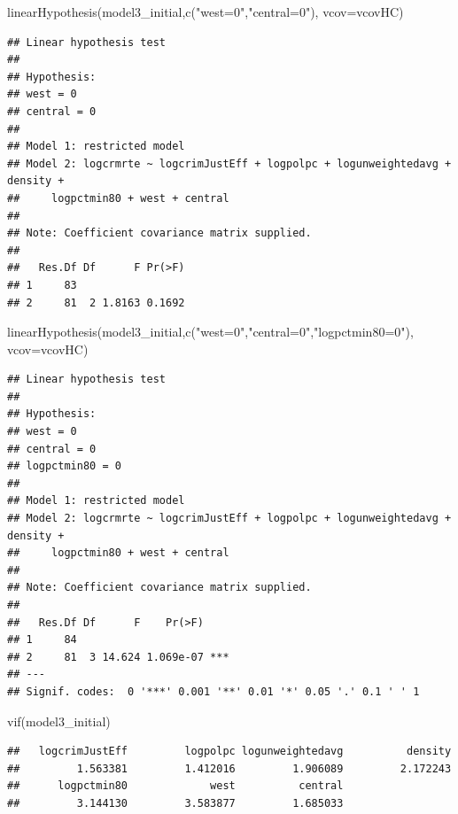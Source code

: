 \documentclass[]{article}
\newenvironment{Shaded}{}{}
\newcommand{\DataTypeTok}[1]{#1}
\newcommand{\KeywordTok}[1]{\textcolor[rgb]{0.00,0.00,1.00}{#1}}
\newcommand{\NormalTok}[1]{#1}
\newcommand{\StringTok}[1]{\textcolor[rgb]{0.00,0.50,0.50}{#1}}
\begin{document}
\begin{Shaded}
\begin{Highlighting}[]
\KeywordTok{linearHypothesis}\NormalTok{(model3_initial,}\KeywordTok{c}\NormalTok{(}\StringTok{"west=0"}\NormalTok{,}\StringTok{"central=0"}\NormalTok{), }\DataTypeTok{vcov=}\NormalTok{vcovHC)}
\end{Highlighting}
\end{Shaded}

\begin{verbatim}
## Linear hypothesis test
## 
## Hypothesis:
## west = 0
## central = 0
## 
## Model 1: restricted model
## Model 2: logcrmrte ~ logcrimJustEff + logpolpc + logunweightedavg + density + 
##     logpctmin80 + west + central
## 
## Note: Coefficient covariance matrix supplied.
## 
##   Res.Df Df      F Pr(>F)
## 1     83                 
## 2     81  2 1.8163 0.1692
\end{verbatim}

\begin{Shaded}
\begin{Highlighting}[]
\KeywordTok{linearHypothesis}\NormalTok{(model3_initial,}\KeywordTok{c}\NormalTok{(}\StringTok{"west=0"}\NormalTok{,}\StringTok{"central=0"}\NormalTok{,}\StringTok{"logpctmin80=0"}\NormalTok{), }\DataTypeTok{vcov=}\NormalTok{vcovHC)}
\end{Highlighting}
\end{Shaded}

\begin{verbatim}
## Linear hypothesis test
## 
## Hypothesis:
## west = 0
## central = 0
## logpctmin80 = 0
## 
## Model 1: restricted model
## Model 2: logcrmrte ~ logcrimJustEff + logpolpc + logunweightedavg + density + 
##     logpctmin80 + west + central
## 
## Note: Coefficient covariance matrix supplied.
## 
##   Res.Df Df      F    Pr(>F)    
## 1     84                        
## 2     81  3 14.624 1.069e-07 ***
## ---
## Signif. codes:  0 '***' 0.001 '**' 0.01 '*' 0.05 '.' 0.1 ' ' 1
\end{verbatim}

\begin{Shaded}
\begin{Highlighting}[]
\KeywordTok{vif}\NormalTok{(model3_initial)}
\end{Highlighting}
\end{Shaded}

\begin{verbatim}
##   logcrimJustEff         logpolpc logunweightedavg          density 
##         1.563381         1.412016         1.906089         2.172243 
##      logpctmin80             west          central 
##         3.144130         3.583877         1.685033
\end{verbatim}
\end{document}
